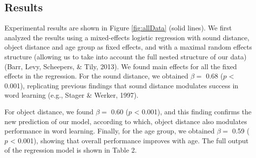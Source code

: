 \documentclass[english,,man]{apa6}
\begin{document}
\hypertarget{results}{%
\subsection{Results}\label{results}}

Experimental results are shown in Figure \ref{fig:allData} (solid lines). We first analyzed the results using a mixed-effects logistic regression with sound distance, object distance and age group as fixed effects, and with a maximal random effects structure (allowing us to take into account the full nested structure of our data) (Barr, Levy, Scheepers, \& Tily, 2013). We found main effects for all the fixed effects in the regression. For the sound distance, we obtained \(\beta =\) 0.68 (\(p\) \textless{} 0.001), replicating previous findings that sound distance modulates success in word learning (e.g., Stager \& Werker, 1997).

For object distance, we found \(\beta =\) 0.60 (\(p\) \textless{} 0.001), and this finding confirms the new prediction of our model, according to which, object distance also modulates performance in word learning. Finally, for the age group, we obtained \(\beta =\) 0.59 (\(p\) \textless{} 0.001), showing that overall performance improves with age. The full output of the regression model is shown in Table 2.

\begin{table}

\caption{\label{tab:models}Characteristics and performance of the models used in this study. Value ranges represent 95\% confidence intervals.}
\centering
{}
\end{table}
\end{document}
